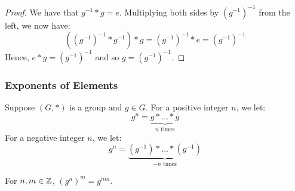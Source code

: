 \documentclass[letterpaper]{article}
\begin{document}
\begin{mdframed}
    \begin{proof}
        We have that $g^{-1} * g = e$. Multiplying both sides by $(g^{-1})^{-1}$ from the left, we now have: 
        \[((g^{-1})^{-1} * g^{-1}) * g = (g^{-1})^{-1} * e = (g^{-1})^{-1}\]
        Hence, $e * g = (g^{-1})^{-1}$ and so $g = (g^{-1})^{-1}$.     
    \end{proof}
\end{mdframed}

\subsubsection{Exponents of Elements}
Suppose $(G, *)$ is a group and $g \in G$. For a positive integer $n$, we let: 
\[g^n = \underbrace{g * \dots * g}_{n \text{ times}}\]
For a negative integer $n$, we let: 
\[g^n = \underbrace{(g^{-1}) * \dots * (g^{-1})}_{-n \text{ times}}\]

\begin{lemma}{}{}
    For $n, m \in \mathbb{Z}$, $(g^n)^m = g^{nm}$. 
\end{lemma}
\end{document}
